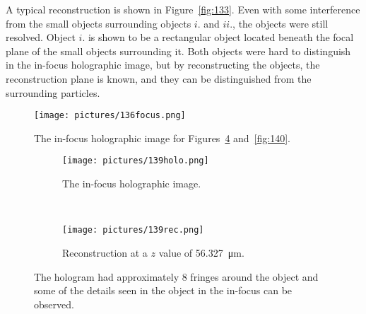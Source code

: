 A typical reconstruction is shown in Figure~\ref{fig:133}. Even with some
interference from the small objects surrounding objects $i.$ and $ii.$, the
objects were still resolved. Object $i.$ is shown to be a rectangular object
located beneath the focal plane of the small objects surrounding it. Both objects were
hard to distinguish in the in-focus holographic image, but by reconstructing
the objects, the reconstruction plane is known, and they can be
distinguished from the surrounding particles.


\begin{figure}
\begin{center}
    \texttt{[image: pictures/136focus.png]}
    \caption{The in-focus holographic image for Figures~\ref{fig:139} and~\ref{fig:140}. }
    \label{fig:136focus}
\end{center}
\end{figure}


\begin{figure}[ht!]
    \begin{center}

        \begin{subfigure}[t]{0.4\textwidth}
            \label{fig:139holo}
            \texttt{[image: pictures/139holo.png]}
            \caption{The in-focus holographic image.}
        \end{subfigure}
        \\
        \begin{subfigure}[t]{\textwidth}
            \label{fig:139rec}
            \texttt{[image: pictures/139rec.png]}
            \caption{Reconstruction at a $z$ value of
                \SI{56.327}{\micro\meter}.}
        \end{subfigure}


    \end{center}
    \caption{%
        The hologram had approximately 8 fringes around the object and
        some of the details seen in the object in the in-focus can be observed.
    }%
    \label{fig:139}
\end{figure}


